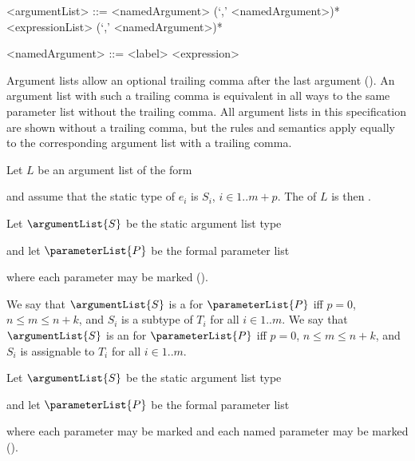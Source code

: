 \documentclass[makeidx]{article}
\begin{document}
{\begin{grammar}
<argumentList> ::= <namedArgument> (`,' <namedArgument>)*
  \alt <expressionList> (`,' <namedArgument>)*

<namedArgument> ::= <label> <expression>
\end{grammar}

\LMHash{}%
Argument lists allow an optional trailing comma after the last argument
().
An argument list with such a trailing comma is equivalent in all ways to
the same parameter list without the trailing comma.
All argument lists in this specification are shown without a trailing comma,
but the rules and semantics apply equally to
the corresponding argument list with a trailing comma.

\LMHash{}%
Let $L$ be an argument list of the form

\noindent
{}

\noindent
and assume that the static type of $e_i$ is $S_i$, $i \in 1 .. m+p$.
The  of $L$ is then
.

\LMHash{}%
Let $\argumentList{S}$ be the static argument list type

\noindent
{}

\noindent
and let $\parameterList{P}$ be the formal parameter list

\noindent
{}

\noindent
where each parameter may be marked \COVARIANT{}
().

\LMHash{}%
We say that $\argumentList{S}$ is
a  for $\parameterList{P}$
if{}f $p = 0$, $n \leq m \leq n+k$, and $S_i$ is
a subtype of $T_i$ for all $i \in 1 .. m$.
We say that $\argumentList{S}$ is
an  for $\parameterList{P}$
if{}f $p = 0$, $n \leq m \leq n+k$, and $S_i$ is
assignable to $T_i$ for all $i \in 1 .. m$.

\LMHash{}%
Let $\argumentList{S}$ be the static argument list type

\noindent
{}

\noindent
and let $\parameterList{P}$ be the formal parameter list

\noindent
{}

\noindent
where each parameter may be marked \COVARIANT{}
and each named parameter may be marked \REQUIRED{}
().

}
\end{document}
